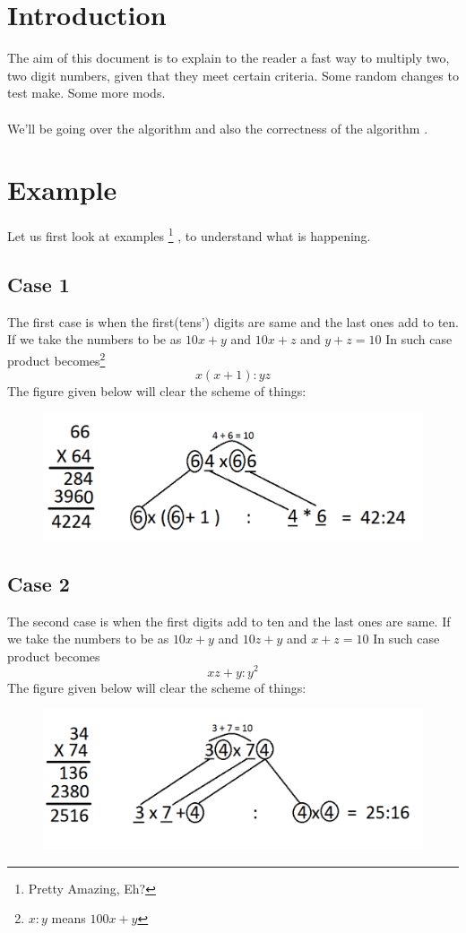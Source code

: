 \section{Introduction}
\label{sec:intro}
The aim of this document is to explain to the reader a fast way to multiply two, two digit numbers, given that they meet certain criteria. Some random changes to test make. Some more mods.
\\
\\
We'll be going over the algorithm \cite{atharv} and also the correctness of the algorithm \cite{sidpaper}.

\section{Example}
\label{sec:example}
Let us first look at examples \footnote{Pretty Amazing, Eh?} , to understand what is happening.
\subsection{Case 1}
\label{subsec:c1}
The first case is when the first(tens') digits are same and the last ones add to ten.
If we take the numbers to be as $10x+y$ and $10x+z$ and $y+z=10$
In such case product becomes\footnote{ $x : y$ means $100x + y$}
$$x(x+1) : yz$$
The figure given below will clear the scheme of things:
\begin{figure}[h]
\centering
\includegraphics[scale=0.4]{case1.pdf}
\end{figure}
\subsection{Case 2}
\label{subsec:c2}
The second case is when the first digits add to ten and the last ones are same.
If we take the numbers to be as $10x+y$ and $10z+y$ and $x+z=10$
In such case product becomes
$$xz + y : y^2$$
The figure given below will clear the scheme of things:
\begin{figure}[h]
\centering
\includegraphics[scale=0.4]{case2.pdf}
\end{figure}
\newpage
